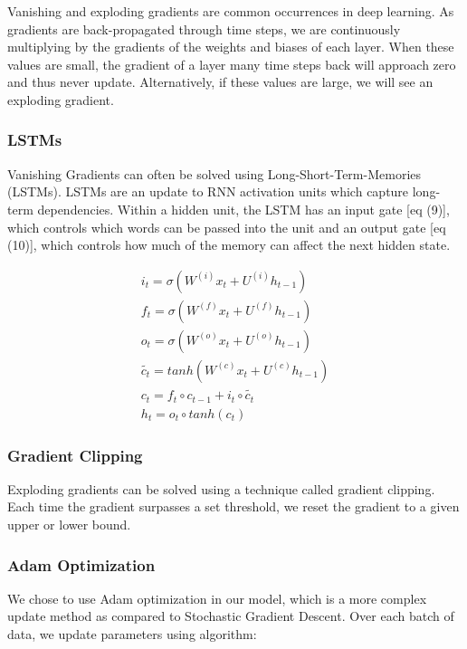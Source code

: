 \documentclass{article} %
\begin{document}
Vanishing and exploding gradients are common occurrences in deep learning. As
gradients are back-propagated through time steps, we are continuously
multiplying by the gradients of the weights and biases of each layer. When these
values are small, the gradient of a layer many time steps back will approach
zero and thus never update. Alternatively, if these values are large, we will
see an exploding gradient.

\subsubsection*{LSTMs}

Vanishing Gradients can often be solved using Long-Short-Term-Memories (LSTMs).
LSTMs are an update to RNN activation units which capture long-term
dependencies. Within a hidden unit, the LSTM has an input gate [eq (9)], which
controls which words can be passed into the unit and an output gate [eq (10)],
which controls how much of the memory can affect the next hidden state.

\begin{gather}
i_t = \sigma (W^{(i)} x_t + U^{(i)} h_{t-1}) \\
f_t = \sigma (W^{(f)} x_t + U^{(f)} h_{t-1}) \\
o_t = \sigma (W^{(o)} x_t + U^{(o)} h_{t-1}) \\
\widetilde{c_t} = tanh (W^{(c)} x_t + U^{(c)} h_{t-1}) \\
c_t = f_t \circ c_{t - 1} + i_t \circ \widetilde{c_t} \\
h_t = o_t \circ tanh(c_t)
\end{gather}

\subsubsection*{Gradient Clipping}

Exploding gradients can be solved using a technique called gradient clipping.
Each time the gradient surpasses a set threshold, we reset the gradient to a
given upper or lower bound.

\subsubsection{Adam Optimization}

We chose to use Adam optimization in our model, which is a more complex update
method as compared to Stochastic Gradient Descent. Over each batch of data, we
update parameters using algorithm:
\end{document}
